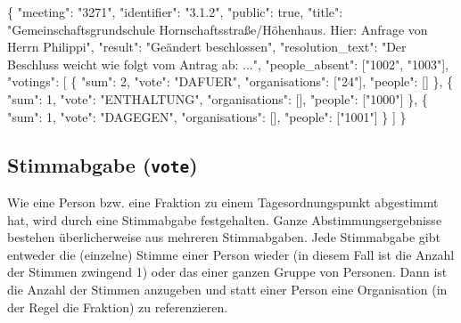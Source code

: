 \documentclass[,a4paper]{article}
\newenvironment{Shaded}{}{}
\newcommand{\DataTypeTok}[1]{\textcolor[rgb]{0.56,0.13,0.00}{{#1}}}
\newcommand{\DecValTok}[1]{\textcolor[rgb]{0.25,0.63,0.44}{{#1}}}
\newcommand{\StringTok}[1]{\textcolor[rgb]{0.25,0.44,0.63}{{#1}}}
\newcommand{\NormalTok}[1]{{#1}}
\begin{document}
\begin{Shaded}
\begin{Highlighting}[]
\NormalTok{\{}
    \DataTypeTok{"meeting"}\NormalTok{: }\StringTok{"3271"}\NormalTok{,}
    \DataTypeTok{"identifier"}\NormalTok{: }\StringTok{"3.1.2"}\NormalTok{,}
    \DataTypeTok{"public"}\NormalTok{: }\DecValTok{true}\NormalTok{,}
    \DataTypeTok{"title"}\NormalTok{: }\StringTok{"Gemeinschaftsgrundschule Hornschaftsstraße/Höhenhaus. Hier: Anfrage von Herrn Philippi"}\NormalTok{,}
    \DataTypeTok{"result"}\NormalTok{: }\StringTok{"Geändert beschlossen"}\NormalTok{,}
    \DataTypeTok{"resolution_text"}\NormalTok{: }\StringTok{"Der Beschluss weicht wie folgt vom Antrag ab: ..."}\NormalTok{,}
    \DataTypeTok{"people_absent"}\NormalTok{: [}\StringTok{"1002"}\NormalTok{, }\StringTok{"1003"}\NormalTok{],}
    \DataTypeTok{"votings"}\NormalTok{: [}
        \NormalTok{\{}
            \DataTypeTok{"sum"}\NormalTok{: }\DecValTok{2}\NormalTok{,}
            \DataTypeTok{"vote"}\NormalTok{: }\StringTok{"DAFUER"}\NormalTok{,}
            \DataTypeTok{"organisations"}\NormalTok{: [}\StringTok{"24"}\NormalTok{],}
            \DataTypeTok{"people"}\NormalTok{: []}
        \NormalTok{\},}
        \NormalTok{\{}
            \DataTypeTok{"sum"}\NormalTok{: }\DecValTok{1}\NormalTok{,}
            \DataTypeTok{"vote"}\NormalTok{: }\StringTok{"ENTHALTUNG"}\NormalTok{,}
            \DataTypeTok{"organisations"}\NormalTok{: [],}
            \DataTypeTok{"people"}\NormalTok{: [}\StringTok{"1000"}\NormalTok{]}
        \NormalTok{\},}
        \NormalTok{\{}
            \DataTypeTok{"sum"}\NormalTok{: }\DecValTok{1}\NormalTok{,}
            \DataTypeTok{"vote"}\NormalTok{: }\StringTok{"DAGEGEN"}\NormalTok{,}
            \DataTypeTok{"organisations"}\NormalTok{: [],}
            \DataTypeTok{"people"}\NormalTok{: [}\StringTok{"1001"}\NormalTok{]}
        \NormalTok{\}}
    \NormalTok{]}
\NormalTok{\}}
\end{Highlighting}
\end{Shaded}

\subsection{Stimmabgabe (\texttt{vote})}

Wie eine Person bzw. eine Fraktion zu einem Tagesordnungspunkt
abgestimmt hat, wird durch eine Stimmabgabe festgehalten. Ganze
Abstimmungsergebnisse bestehen überlicherweise aus mehreren
Stimmabgaben. Jede Stimmabgabe gibt entweder die (einzelne) Stimme einer
Person wieder (in diesem Fall ist die Anzahl der Stimmen zwingend 1)
oder das einer ganzen Gruppe von Personen. Dann ist die Anzahl der
Stimmen anzugeben und statt einer Person eine Organisation (in der Regel
die Fraktion) zu referenzieren.
\end{document}
